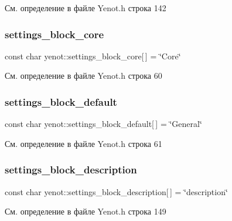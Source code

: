 См. определение в файле Yenot.\+h строка 142

\mbox{\label{namespaceyenot_a2640b6ef7faaea51fd49edfd377c62a5}} 
\subsubsection{\texorpdfstring{settings\+\_\+block\+\_\+core}{settings\_block\_core}}
{\footnotesize\ttfamily const char yenot\+::settings\+\_\+block\+\_\+core\mbox{[}$\,$\mbox{]} = \char`\"{}Core\char`\"{}}



См. определение в файле Yenot.\+h строка 60

\mbox{\label{namespaceyenot_a2c183b5b1119e19804dce22eaad06010}} 
\subsubsection{\texorpdfstring{settings\+\_\+block\+\_\+default}{settings\_block\_default}}
{\footnotesize\ttfamily const char yenot\+::settings\+\_\+block\+\_\+default\mbox{[}$\,$\mbox{]} = \char`\"{}General\char`\"{}}



См. определение в файле Yenot.\+h строка 61

\mbox{\label{namespaceyenot_aea7e9eb4d5b9e645f22e83e2d5fe893e}} 
\subsubsection{\texorpdfstring{settings\+\_\+block\+\_\+description}{settings\_block\_description}}
{\footnotesize\ttfamily const char yenot\+::settings\+\_\+block\+\_\+description\mbox{[}$\,$\mbox{]} = \char`\"{}description\char`\"{}}



См. определение в файле Yenot.\+h строка 149


